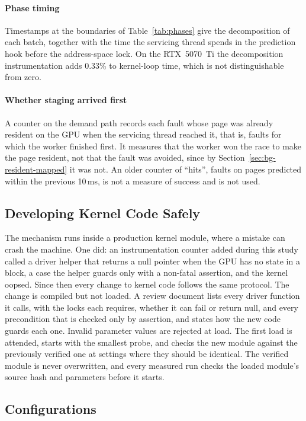 \paragraph{Phase timing}
Timestamps at the boundaries of Table~\ref{tab:phases} give the
decomposition of each batch, together with the time the servicing thread
spends in the prediction hook before the address-space lock. On the
RTX~5070~Ti the decomposition instrumentation adds 0.33\% to kernel-loop time,
which is not distinguishable from zero.

\paragraph{Whether staging arrived first}
A counter on the demand path records each fault whose page was already
resident on the GPU when the servicing thread reached it, that is, faults
for which the worker finished first. It measures that the worker won the
race to make the page resident, not that the fault was avoided, since by
Section~\ref{sec:bg-resident-mapped} it was not. An older counter of
``hits'', faults on pages predicted within the previous 10\,ms, is not a
measure of success and is not used.

\subsection{Developing Kernel Code Safely}
\label{sec:design-safety}

The mechanism runs inside a production kernel module, where a mistake can
crash the machine. One did: an instrumentation counter added during this
study called a driver helper that returns a null pointer when the GPU has no
state in a block, a case the helper guards only with a non-fatal assertion,
and the kernel oopsed. Since then every change to kernel code follows the
same protocol. The change is compiled but not loaded. A review document lists
every driver function it calls, with the locks each requires, whether it can
fail or return null, and every precondition that is checked only by
assertion, and states how the new code guards each one. Invalid parameter
values are rejected at load. The first load is attended, starts with the
smallest probe, and checks the new module against the previously verified
one at settings where they should be identical. The verified module is never
overwritten, and every measured run checks the loaded module's source hash
and parameters before it starts.

\subsection{Configurations}
\label{sec:design-configs}

